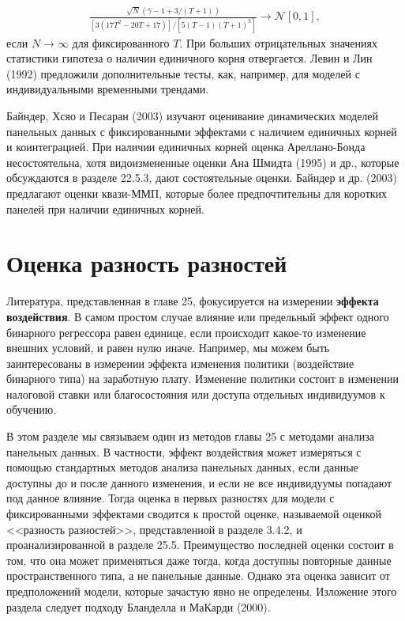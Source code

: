 \begin{align}
\frac{\sqrt{N}(\hat{\gamma}-1+3/(T+1))}
{[3(17T^2-20T+17)]/[5(T-1)(T+1)^3]} \rightarrow \mathcal N [0,1],
\nonumber
\end{align}
если $N \rightarrow \infty$ для фиксированного $T$. При больших отрицательных значениях статистики гипотеза о наличии единичного корня отвергается. Левин и Лин (1992) предложили дополнительные тесты, как, например, для моделей с индивидуальными временными трендами.

Байндер, Хсяо и Песаран (2003) изучают оценивание динамических моделей панельных данных с фиксированными эффектами с наличием единичных корней и коинтеграцией. При наличии единичных корней оценка Ареллано-Бонда несостоятельна, хотя видоизмененные оценки Ана Шмидта (1995) и др., которые обсуждаются в разделе 22.5.3, дают состоятельные оценки. Байндер и др. (2003) предлагают оценки квази-ММП, которые более предпочтительны для коротких панелей при наличии единичных корней.

\section{Оценка разность разностей}

Литература, представленная в главе 25, фокусируется на измерении \textbf{эффекта воздействия}. В самом простом случае влияние или предельный эффект одного бинарного регрессора равен единице, если происходит какое-то изменение внешних условий, и равен нулю иначе.
Например, мы можем быть заинтересованы в измерении эффекта изменения политики (воздействие бинарного типа) на заработную плату. Изменение политики состоит в изменении налоговой ставки или благосостояния или доступа отдельных индивидуумов к обучению.

В этом разделе мы связываем один из методов главы 25 с методами анализа панельных данных. В частности, эффект воздействия может измеряться с помощью стандартных методов анализа панельных данных, если данные доступны до и после данного изменения, и если не все индивидуумы попадают под данное влияние. Тогда оценка в первых разностях для модели с фиксированными эффектами сводится к простой оценке, называемой оценкой <<разность разностей>>, представленной в разделе 3.4.2, и проанализированной в разделе 25.5. 
Преимущество последней оценки состоит в том, что она может применяться даже тогда, когда доступны повторные данные пространственного типа, а не панельные данные. Однако эта оценка зависит от предположений модели, которые зачастую явно не определены. Изложение этого раздела следует подходу Бланделла и МаКарди (2000).

